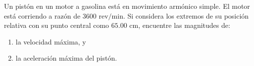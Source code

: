 \item Un pistón en un motor a gasolina está en movimiento armónico simple. El motor está corriendo a razón de $3600\text{ rev/min}$. Si considera los extremos de su posición relativa con su punto central como $65.00\text{ cm}$, encuentre las magnitudes de:
\begin{enumerate}
    \item la velocidad máxima, y
    \item la aceleración máxima del pistón.
\end{enumerate}